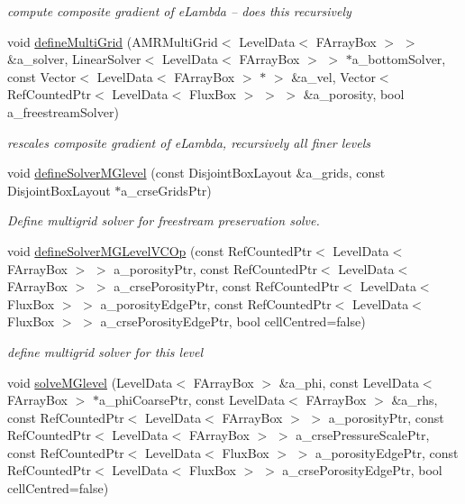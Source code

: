 \begin{DoxyCompactItemize}
\begin{DoxyCompactList}\small\item\em compute composite gradient of e\-Lambda -- does this recursively \end{DoxyCompactList}\item 
void \hyperlink{class_c_c_projector_a3b905445dfce1e8ab339f0ad85e26b45}{define\-Multi\-Grid} (A\-M\-R\-Multi\-Grid$<$ Level\-Data$<$ F\-Array\-Box $>$ $>$ \&a\-\_\-solver, Linear\-Solver$<$ Level\-Data$<$ F\-Array\-Box $>$ $>$ $\ast$a\-\_\-bottom\-Solver, const Vector$<$ Level\-Data$<$ F\-Array\-Box $>$ $\ast$ $>$ \&a\-\_\-vel, Vector$<$ Ref\-Counted\-Ptr$<$ Level\-Data$<$ Flux\-Box $>$ $>$ $>$ \&a\-\_\-porosity, bool a\-\_\-freestream\-Solver)
\begin{DoxyCompactList}\small\item\em rescales composite gradient of e\-Lambda, recursively all finer levels \end{DoxyCompactList}\item 
void \hyperlink{class_c_c_projector_ad1826c62c5ee7fd1395fd7abdfaf747e}{define\-Solver\-M\-Glevel} (const Disjoint\-Box\-Layout \&a\-\_\-grids, const Disjoint\-Box\-Layout $\ast$a\-\_\-crse\-Grids\-Ptr)
\begin{DoxyCompactList}\small\item\em Define multigrid solver for freestream preservation solve. \end{DoxyCompactList}\item 
void \hyperlink{class_c_c_projector_a67cb3a305d06e5fc4a6a02164730f83a}{define\-Solver\-M\-G\-Level\-V\-C\-Op} (const Ref\-Counted\-Ptr$<$ Level\-Data$<$ F\-Array\-Box $>$ $>$ a\-\_\-porosity\-Ptr, const Ref\-Counted\-Ptr$<$ Level\-Data$<$ F\-Array\-Box $>$ $>$ a\-\_\-crse\-Porosity\-Ptr, const Ref\-Counted\-Ptr$<$ Level\-Data$<$ Flux\-Box $>$ $>$ a\-\_\-porosity\-Edge\-Ptr, const Ref\-Counted\-Ptr$<$ Level\-Data$<$ Flux\-Box $>$ $>$ a\-\_\-crse\-Porosity\-Edge\-Ptr, bool cell\-Centred=false)
\begin{DoxyCompactList}\small\item\em define multigrid solver for this level \end{DoxyCompactList}\item 
\hypertarget{class_c_c_projector_a3b79907f4f05faf6ef2c785a3129e59d}{void \hyperlink{class_c_c_projector_a3b79907f4f05faf6ef2c785a3129e59d}{solve\-M\-Glevel} (Level\-Data$<$ F\-Array\-Box $>$ \&a\-\_\-phi, const Level\-Data$<$ F\-Array\-Box $>$ $\ast$a\-\_\-phi\-Coarse\-Ptr, const Level\-Data$<$ F\-Array\-Box $>$ \&a\-\_\-rhs, const Ref\-Counted\-Ptr$<$ Level\-Data$<$ F\-Array\-Box $>$ $>$ a\-\_\-porosity\-Ptr, const Ref\-Counted\-Ptr$<$ Level\-Data$<$ F\-Array\-Box $>$ $>$ a\-\_\-crse\-Pressure\-Scale\-Ptr, const Ref\-Counted\-Ptr$<$ Level\-Data$<$ Flux\-Box $>$ $>$ a\-\_\-porosity\-Edge\-Ptr, const Ref\-Counted\-Ptr$<$ Level\-Data$<$ Flux\-Box $>$ $>$ a\-\_\-crse\-Porosity\-Edge\-Ptr, bool cell\-Centred=false)}\label{class_c_c_projector_a3b79907f4f05faf6ef2c785a3129e59d}


\end{DoxyCompactItemize}
